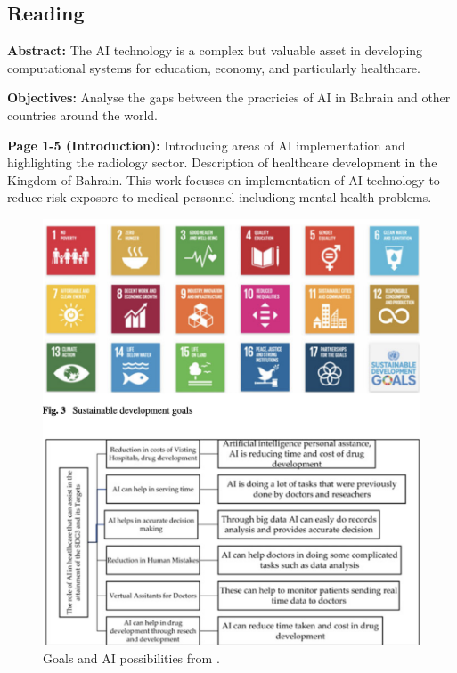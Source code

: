 \subsection{Reading}
    \textbf{Abstract:}
    The AI technology is a complex but valuable asset in developing computational systems for education, economy, and particularly healthcare.
    
    \textbf{Objectives:}
    Analyse the gaps between the pracricies of AI in Bahrain and other countries around the world.

    \textbf{Page 1-5 (Introduction):}
    Introducing areas of AI implementation and highlighting the radiology sector. Description of healthcare development in the Kingdom of Bahrain. This work focuses on implementation of AI technology to reduce risk exposore to medical personnel includiong mental health problems. 
    \begin{figure}[H]
        \centering
        \includegraphics[width=1\textwidth]{figures/0023_SR07US23/fig2.png}
        \caption{Goals and AI possibilities from \cite{x101}.}
        \label{fig2:0023_SR07US23}
    \end{figure}

